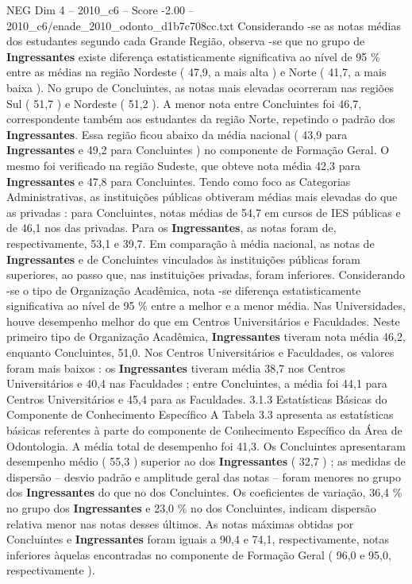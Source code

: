 \begin{textsample}{NEG Dim 4 – 2010\_c6 – Score -2.00 – 2010\_c6/enade\_2010\_odonto\_d1b7c708cc.txt}
Considerando -se as notas médias dos estudantes segundo cada Grande Região, observa -se que no grupo de \textbf{Ingressantes} existe diferença estatisticamente significativa ao nível de 95 \% entre as médias na região Nordeste ( 47,9, a mais alta ) e Norte ( 41,7, a mais baixa ).
No grupo de Concluintes, as notas mais elevadas ocorreram nas regiões Sul ( 51,7 ) e Nordeste ( 51,2 ).
A menor nota entre Concluintes foi 46,7, correspondente também aos estudantes da região Norte, repetindo o padrão dos \textbf{Ingressantes}.
Essa região ficou abaixo da média nacional ( 43,9 para \textbf{Ingressantes} e 49,2 para Concluintes ) no componente de Formação Geral.
O mesmo foi verificado na região Sudeste, que obteve nota média 42,3 para \textbf{Ingressantes} e 47,8 para Concluintes.
Tendo como foco as Categorias Administrativas, as instituições públicas obtiveram médias mais elevadas do que as privadas : para Concluintes, notas médias de 54,7 em cursos de IES públicas e de 46,1 nos das privadas.
Para os \textbf{Ingressantes}, as notas foram de, respectivamente, 53,1 e 39,7.
Em comparação à média nacional, as notas de \textbf{Ingressantes} e de Concluintes vinculados às instituições públicas foram superiores, ao passo que, nas instituições privadas, foram inferiores.
Considerando -se o tipo de Organização Acadêmica, nota -se diferença estatisticamente significativa ao nível de 95 \% entre a melhor e a menor média.
Nas Universidades, houve desempenho melhor do que em Centros Universitários e Faculdades.
Neste primeiro tipo de Organização Acadêmica, \textbf{Ingressantes} tiveram nota média 46,2, enquanto Concluintes, 51,0.
Nos Centros Universitários e Faculdades, os valores foram mais baixos : os \textbf{Ingressantes} tiveram média 38,7 nos Centros Universitários e 40,4 nas Faculdades ; entre Concluintes, a média foi 44,1 para Centros Universitários e 45,4 para as Faculdades. 3.1.3 Estatísticas Básicas do Componente de Conhecimento Específico A Tabela 3.3 apresenta as estatísticas básicas referentes à parte do componente de Conhecimento Específico da Área de Odontologia.
A média total de desempenho foi 41,3.
Os Concluintes apresentaram desempenho médio ( 55,3 ) superior ao dos \textbf{Ingressantes} ( 32,7 ) ; as medidas de dispersão – desvio padrão e amplitude geral das notas – foram menores no grupo dos \textbf{Ingressantes} do que no dos Concluintes.
Os coeficientes de variação, 36,4 \% no grupo dos \textbf{Ingressantes} e 23,0 \% no dos Concluintes, indicam dispersão relativa menor nas notas desses últimos.
As notas máximas obtidas por Concluintes e \textbf{Ingressantes} foram iguais a 90,4 e 74,1, respectivamente, notas inferiores àquelas encontradas no componente de Formação Geral ( 96,0 e 95,0, respectivamente ).

\end{textsample}
